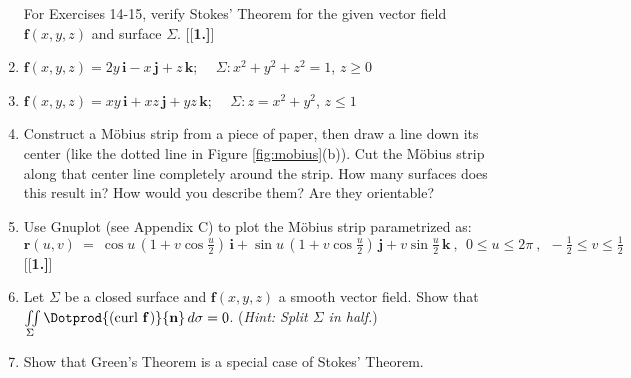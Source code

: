 \begin{multicols}{2}
\begin{enumerate}[\bfseries 1.]
\par\noindent For Exercises 14-15, verify Stokes' Theorem for the given vector field $\textbf{f}(x,y,z)$ and
surface $\Sigma$.
[{[\bfseries 1.]}]
 \item $\textbf{f}(x,y,z) = 2y\,\textbf{i} - x\,\textbf{j} + z\,\textbf{k}$; $\quad \Sigma: x^2 + y^2 + z^2 = 1$,
  $z \ge 0$
 \item $\textbf{f}(x,y,z) = xy\,\textbf{i} + xz\,\textbf{j} + yz\,\textbf{k}$; $\quad \Sigma: z=x^2 + y^2$, $z \le 1$
 \item Construct a M\"{o}bius strip from a piece of paper, then draw a line down its center (like the dotted line in
 Figure \ref{fig:mobius}(b)). Cut the M\"{o}bius strip along that center line completely around the strip. How many
 surfaces does this result in? How would you describe them? Are they orientable?
 \item Use Gnuplot (see Appendix C) to plot the M\"{o}bius strip parametrized as:
  \begin{displaymath}
   \textbf{r}(u,v) ~=~ \cos u \,(1+v\cos \tfrac{u}{2})\,\textbf{i} + \sin u \,(1+v\cos \tfrac{u}{2})\,\textbf{j} +
    v\sin \tfrac{u}{2}\,\textbf{k} ~,~~ 0 \le u \le 2\pi ~,~~ -\tfrac{1}{2} \le v \le \tfrac{1}{2}
  \end{displaymath}
[{[\bfseries 1.]}]
 \item Let $\Sigma$ be a closed surface and $\textbf{f}(x,y,z)$ a smooth vector field. Show that\\
  $\iint\limits_{\Sigma} \Dotprod{(\text{curl}~{\textbf{f}}\,)}{\textbf{n}}\,d\sigma = 0$. (\emph{Hint: Split $\Sigma$
  in half.})
 \item Show that Green's Theorem is a special case of Stokes' Theorem.
\end{enumerate}
\end{multicols}

